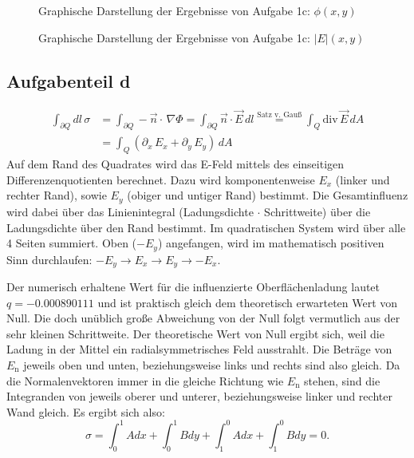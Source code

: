\begin{landscape}
	\begin{figure}
		\caption{Graphische Darstellung der Ergebnisse von Aufgabe 1c: $\phi(x,y)$}
		\label{fig:cPhi}
	\end{figure}
\end{landscape} 

\begin{landscape}
	\begin{figure}
		\caption{Graphische Darstellung der Ergebnisse von Aufgabe 1c: $|E|(x,y)$}
		\label{fig:cabsE}
	\end{figure}
\end{landscape} 

\subsection*{Aufgabenteil d}
\begin{align}		\int_{\partial Q} dl\,\sigma &= \int_{\partial Q} -\vec{n}\cdot \,\nabla \Phi = \int_{\partial Q} 	\vec{n}\cdot \vec{E}\,dl \stackrel{\text{Satz v. Gauß}}{=} \int_{Q} \text{div}\,\vec{E}\, dA \\
		&= \int_{Q} \left(\partial_x \,E_x+\partial_y\,E_y\right)\, dA 
\end{align}%
Auf dem Rand des Quadrates wird das E-Feld mittels des einseitigen Differenzenquotienten berechnet. Dazu wird komponentenweise $E_x$ (linker und rechter Rand), sowie $E_y$ (obiger und untiger Rand) bestimmt. Die Gesamtinfluenz wird dabei über das Linienintegral (Ladungsdichte $\cdot$ Schrittweite) über die Ladungsdichte über den Rand bestimmt. Im quadratischen System wird über alle 4 Seiten summiert. Oben ($-E_y$) angefangen, wird im mathematisch positiven Sinn durchlaufen: $-E_y \rightarrow E_x \rightarrow E_y \rightarrow -E_x$.
\begin{sloppypar}
Der numerisch erhaltene Wert für die influenzierte Oberflächenladung lautet \mbox{$q = -0.000890111$} und ist praktisch gleich dem theoretisch erwarteten Wert von Null.
Die doch unüblich große Abweichung von der Null folgt vermutlich aus der sehr kleinen Schrittweite.
Der theoretische Wert von Null ergibt sich, weil die Ladung in der Mittel ein radialsymmetrisches Feld ausstrahlt.
Die Beträge von $E_\text{n}$ jeweils oben und unten, beziehungsweise links und rechts sind also gleich.
Da die Normalenvektoren immer in die gleiche Richtung wie $E_\text{n}$ stehen, sind die Integranden von jeweils oberer und unterer, beziehungsweise linker und rechter Wand gleich.
Es ergibt sich also:
\begin{equation}
    \sigma = \int_0^1 A dx + \int_0^1 B dy + \int_1^0 A dx + \int_1^0 B dy = 0.
\end{equation}
\end{sloppypar}
